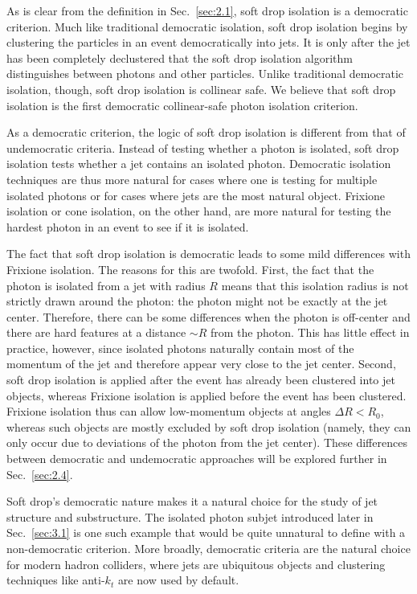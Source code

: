 \documentclass[a4paper,11pt]{article}
\DeclareRobustCommand{\Sec}[1]{Sec.~\ref{#1}}
\begin{document}
As is clear from the definition in \Sec{sec:2.1}, soft drop isolation is a democratic criterion.
%
Much like traditional democratic isolation, soft drop isolation begins by clustering the particles in an event democratically into jets.
%
It is only after the jet has been completely declustered that the soft drop isolation algorithm distinguishes between photons and other particles.
%
Unlike traditional democratic isolation, though, soft drop isolation is collinear safe.
%
We believe that soft drop isolation is the first democratic collinear-safe photon isolation criterion.

As a democratic criterion, the logic of soft drop isolation is different from that of undemocratic criteria.
%
Instead of testing whether a photon is isolated, soft drop isolation tests whether a jet contains an isolated photon.
%
Democratic isolation techniques are thus more natural for cases where one is testing for multiple isolated photons or for cases where jets are the most natural object.
%
Frixione isolation or cone isolation, on the other hand, are more natural for testing the hardest photon in an event to see if it is isolated. 

The fact that soft drop isolation is democratic leads to some mild differences with Frixione isolation.
%
The reasons for this are twofold.
%
First, the fact that the photon is isolated from a jet with radius $R$ means that this isolation radius is not strictly drawn around the photon: the photon might not be exactly at the jet center.
%
Therefore, there can be some differences when the photon is off-center and there are hard features at a distance $\sim R$ from the photon.
%
This has little effect in practice, however, since isolated photons naturally contain most of the momentum of the jet and therefore appear very close to the jet center.
%
Second, soft drop isolation is applied after the event has already been clustered into jet objects, whereas Frixione isolation is applied before the event has been clustered.
%
Frixione isolation thus can allow low-momentum objects at angles $\Delta R < R_0$, whereas such objects are mostly excluded by soft drop isolation (namely, they can only occur due to deviations of the photon from the jet center).
%
These differences between democratic and undemocratic approaches will be explored further in \Sec{sec:2.4}.

Soft drop's democratic nature makes it a natural choice for the study of jet structure and substructure.
%
The isolated photon subjet introduced later in \Sec{sec:3.1} is one such example that would be quite unnatural to define with a non-democratic criterion.
%
More broadly, democratic criteria are the natural choice for modern hadron colliders, where jets are ubiquitous objects and clustering techniques like anti-$k_t$  \cite{Cacciari:2008gp} are now used by default.
\end{document}
